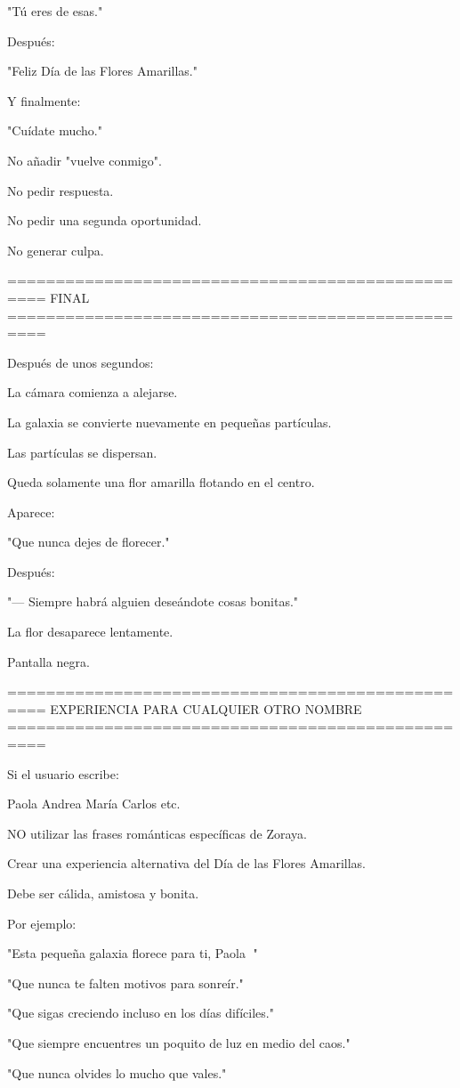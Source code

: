 "Tú eres de esas."

Después:

"Feliz Día de las Flores Amarillas."

Y finalmente:

"Cuídate mucho."

No añadir "vuelve conmigo".

No pedir respuesta.

No pedir una segunda oportunidad.

No generar culpa.

==================================================
FINAL
==================================================

Después de unos segundos:

La cámara comienza a alejarse.

La galaxia se convierte nuevamente en pequeñas partículas.

Las partículas se dispersan.

Queda solamente una flor amarilla flotando en el centro.

Aparece:

"Que nunca dejes de florecer."

Después:

"— Siempre habrá alguien deseándote cosas bonitas."

La flor desaparece lentamente.

Pantalla negra.

==================================================
EXPERIENCIA PARA CUALQUIER OTRO NOMBRE
==================================================

Si el usuario escribe:

Paola
Andrea
María
Carlos
etc.

NO utilizar las frases románticas específicas de Zoraya.

Crear una experiencia alternativa del Día de las Flores Amarillas.

Debe ser cálida, amistosa y bonita.

Por ejemplo:

"Esta pequeña galaxia florece para ti, Paola 🌻"

"Que nunca te falten motivos para sonreír."

"Que sigas creciendo incluso en los días difíciles."

"Que siempre encuentres un poquito de luz en medio del caos."

"Que nunca olvides lo mucho que vales."

